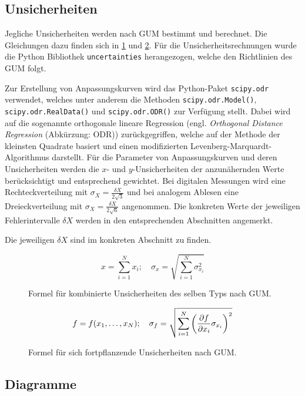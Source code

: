 \subsection{Unsicherheiten}\label{VGuD}

Jegliche Unsicherheiten werden nach GUM\cite{gum} bestimmt und berechnet.
Die Gleichungen dazu finden sich in \cref{fig:GUM_combine} und \cref{fig:GUM_formula}.
Für die Unsicherheitsrechnungen wurde die Python Bibliothek \texttt{uncertainties} herangezogen, welche den Richtlinien des GUM folgt.

Zur Erstellung von Anpassungskurven wird das Python-Paket \texttt{scipy.odr} verwendet, welches unter anderem die Methoden \texttt{scipy.odr.Model()}, \texttt{scipy.odr.RealData()} und \texttt{scipy.odr.ODR()} zur Verfügung stellt.
Dabei wird auf die sogenannte orthogonale lineare Regression (engl. \emph{Orthogonal Distance Regression} (Abkürzung: ODR)) zurückgegriffen, welche auf der Methode der kleinsten Quadrate basiert und einen modifizierten Levenberg-Marquardt-Algorithmus darstellt.
Für die Parameter von Anpassungskurven und deren Unsicherheiten werden die $x$- und $y$-Unsicherheiten der anzunähernden Werte berücksichtigt und entsprechend gewichtet.
Bei digitalen Messungen wird eine Rechteckverteilung mit $\sigma_X = \frac{\delta X}{2\sqrt{3}}$ und bei analogem Ablesen eine Dreieckverteilung mit $\sigma_X = \frac{\delta X}{2\sqrt{6}}$ angenommen.
Die konkreten Werte der jeweiligen Fehlerintervalle $\delta X$ werden in den entsprechenden Abschnitten angemerkt.

Die jeweiligen $\delta X$ sind im konkreten Abschnitt zu finden.
\begin{figure}[ht]
	\begin{equation*}
		x = \sum_{i=1}^{N} x_i
		;\quad
		\sigma_x = \sqrt{\sum_{i = 1}^{N} \sigma_{x_i}^2}
	\end{equation*}
	\caption{Formel für kombinierte Unsicherheiten des selben Typs nach GUM.}
	\label{fig:GUM_combine}
\end{figure}

\begin{figure}[ht]
	\begin{align*}
		f = f(x_1, \dots , x_N)
		;\quad
		\sigma_f = \sqrt{\sum_{i = 1}^{N}\left(\pdv{f}{x_i} \sigma_{x_i}\right) ^2}
	\end{align*}
	\caption{Formel für sich fortpflanzende Unsicherheiten nach GUM.}
	\label{fig:GUM_formula}
\end{figure}

\subsection{Diagramme}

